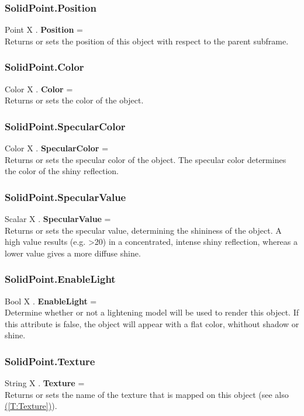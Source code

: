 \documentclass[10pt]{book}
\newcommand{\linkitem}[1]{\hyperref[#1]{\nameref{#1} (\ref{#1})}}
\begin{document}
\subsubsection{SolidPoint.Position \label{F:SolidPoint:Position}}
Point X . \textbf{Position} = \\
Returns or sets the position of this object with respect to the parent subframe.

\subsubsection{SolidPoint.Color \label{F:SolidPoint:Color}}
Color X . \textbf{Color} = \\
Returns or sets the color of the object.

\subsubsection{SolidPoint.SpecularColor \label{F:SolidPoint:SpecularColor}}
Color X . \textbf{SpecularColor} = \\
Returns or sets the specular color of the object. The specular color determines the color of the shiny reflection.

\subsubsection{SolidPoint.SpecularValue \label{F:SolidPoint:SpecularValue}}
Scalar X . \textbf{SpecularValue} = \\
Returns or sets the specular value, determining the shininess of the object. A high value results (e.g. >20) in a concentrated, intense shiny reflection, whereas a lower value gives a more diffuse shine.

\subsubsection{SolidPoint.EnableLight \label{F:SolidPoint:EnableLight}}
Bool X . \textbf{EnableLight} = \\
Determine whether or not a lightening model will be used to render this object. If this attribute is false, the object will appear with a flat color, whithout shadow or shine.

\subsubsection{SolidPoint.Texture \label{F:SolidPoint:Texture}}
String X . \textbf{Texture} = \\
Returns or sets the name of the texture that is mapped on this object (see also \linkitem{T:Texture}).
\end{document}
